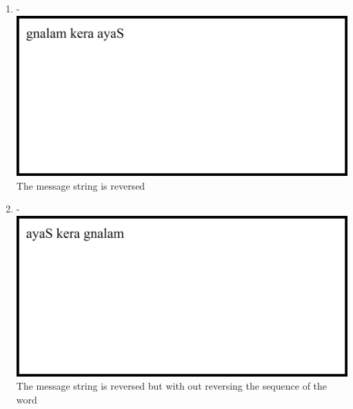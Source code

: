 \documentclass[12pt,titlepage]{article}
\begin{document}
\begin{enumerate}
    \newpage

    \item - \\ \includegraphics[width=.9\textwidth]{images/figures/fig15.png} \\ The message string is reversed
    \item - \\ \includegraphics[width=.9\textwidth]{images/figures/fig16.png} \\ The message string is reversed but with out reversing the sequence of the word
    
    \newpage


\end{enumerate}
\end{document}
